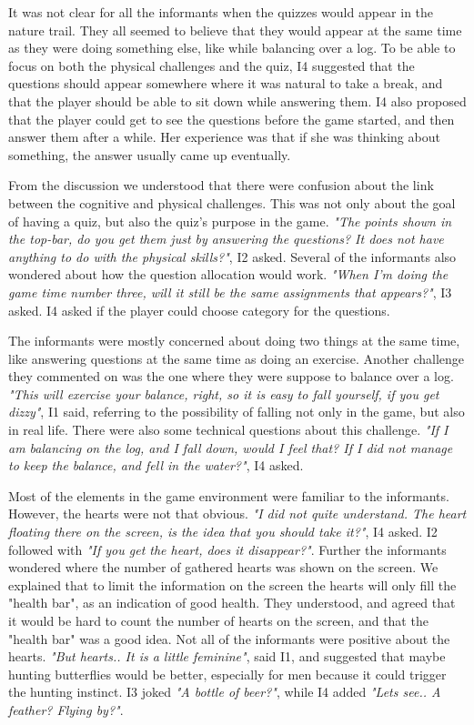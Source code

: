 It was not clear for all the informants when the quizzes would appear in the nature trail. They all seemed to believe that they would appear at the same time as they were doing something else, like while balancing over a log. To be able to focus on both the physical challenges and the quiz, I4 suggested that the questions should appear somewhere where it was natural to take a break, and that the player should be able to sit down while answering them. I4 also proposed that the player could get to see the questions before the game started, and then answer them after a while. Her experience was that if she was thinking about something, the answer usually came up eventually. 

From the discussion we understood that there were confusion about the link between the cognitive and physical challenges. This was not only about the goal of having a quiz, but also the quiz's purpose in the game. \emph{"The points shown in the top-bar, do you get them just by answering the questions? It does not have anything to do with the physical skills?"}, I2 asked. Several of the informants also wondered about how the question allocation would work. \emph{"When I'm doing the game time number three, will it still be the same assignments that appears?"}, I3 asked. I4 asked if the player could choose category for the questions.  

The informants were mostly concerned about doing two things at the same time, like answering questions at the same time as doing an exercise. Another challenge they commented on was the one where they were suppose to balance over a log. \emph{"This will exercise your balance, right, so it is easy to fall yourself, if you get dizzy"}, I1 said, referring to the possibility of falling not only in the game, but also in real life. There were also some technical questions about this challenge. \emph{"If I am balancing on the log, and I fall down, would I feel that? If I did not manage to keep the balance, and fell in the water?"}, I4 asked. 

Most of the elements in the game environment were familiar to the informants. However, the hearts were not that obvious. \emph{"I did not quite understand. The heart floating there on the screen, is the idea that you should take it?"}, I4 asked. I2 followed with \emph{"If you get the heart, does it disappear?"}. Further the informants wondered where the number of gathered hearts was shown on the screen. We explained that to limit the information on the screen the hearts will only fill the "health bar", as an indication of good health. They understood, and agreed that it would be hard to count the number of hearts on the screen, and that the "health bar" was a good idea. Not all of the informants were positive about the hearts. \emph{"But hearts.. It is a little feminine"}, said I1, and suggested that maybe hunting butterflies would be better, especially for men because it could trigger the hunting instinct. I3 joked \emph{"A bottle of beer?"}, while I4 added \emph{"Lets see.. A feather? Flying by?"}. 

